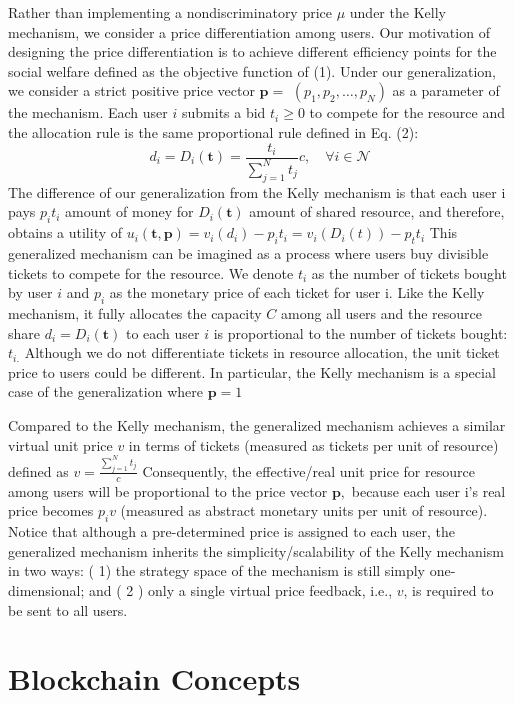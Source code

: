 Rather than implementing a nondiscriminatory price $\mu$ under the Kelly mechanism, we consider a price differentiation among users. Our motivation of designing the price differentiation is to achieve different efficiency points for the social welfare defined as the objective function of (1). Under our generalization, we consider a strict positive price vector $\mathbf{p}=$ $\left(p_{1}, p_{2}, \ldots, p_{N}\right)$ as a parameter of the mechanism. Each user $i$ submits a bid $t_{i} \geq 0$ to compete for the resource and the allocation rule is the same proportional rule defined in Eq. (2):
$$
d_{i}=D_{i}(\mathbf{t})=\frac{t_{i}}{\sum_{j=1}^{N} t_{j}} c, \quad \forall i \in \mathcal{N}
$$
The difference of our generalization from the Kelly mechanism is that each user i pays $p_{i} t_{i}$ amount of money for $D_{i}(\mathbf{t})$ amount
of shared resource, and therefore, obtains a utility of $u_{i}(\mathbf{t}, \mathbf{p})=v_{i}\left(d_{i}\right)-p_{i} t_{i}=v_{i}\left(D_{i}(t)\right)-p_{t} t_{i}$
This generalized mechanism can be imagined as a process where users buy divisible tickets to compete for the resource. We denote $t_{i}$ as the number of tickets bought by user $i$ and $p_{i}$ as the monetary price of each ticket for user i. Like the Kelly mechanism, it fully allocates the capacity $C$ among all users and the resource share $d_{i}=D_{i}(\mathbf{t})$ to each user $i$ is proportional to the number of tickets bought: $t_{i .}$ Although we do not differentiate tickets in resource allocation, the unit ticket price to users could be different. In particular, the Kelly mechanism is a special case of the generalization where $\mathbf{p}=1$

Compared to the Kelly mechanism, the generalized mechanism achieves a similar virtual unit price $v$ in terms of tickets (measured as tickets per unit of resource) defined as $v=\frac{\sum_{j=1}^{N} t_{j}}{c}$
Consequently, the effective/real unit price for resource among users will be proportional to the price vector $\mathbf{p},$ because each user i's real price becomes $p_{i} v$ (measured as abstract monetary units per unit of resource). Notice that although a pre-determined price is assigned to each user, the generalized mechanism inherits the simplicity/scalability of the Kelly mechanism in two ways: ( 1) the strategy space of the mechanism is still simply one-dimensional; and ( 2 ) only a single virtual price feedback, i.e., $v$, is required to be sent to all users.

\section{Blockchain Concepts}

